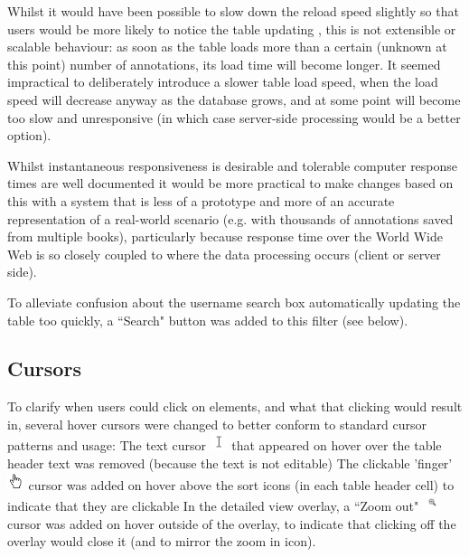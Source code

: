 Whilst it would have been possible to slow down the reload speed slightly so that users would be more likely to notice the table updating \citep[p. 282]{Shneiderman1984}, this is not extensible or scalable behaviour: as soon as the table loads more than a certain (unknown at this point) number of annotations, its load time will become longer. It seemed impractical to deliberately introduce a slower table load speed, when the load speed will decrease anyway as the database grows, and at some point will become too slow and unresponsive (in which case server-side processing would be a better option). 

Whilst instantaneous responsiveness is desirable \citep[p. 272]{DixFinlay} and tolerable computer response times are well documented \citep[p. 154]{Nah} it would be more practical to make changes based on this with a system that is less of a prototype and more of an accurate representation of a real-world scenario (e.g. with thousands of annotations saved from multiple books), particularly because response time over the World Wide Web is so closely coupled to where the data processing occurs (client or server side). 

To alleviate confusion about the username search box automatically updating the table too quickly, a ``Search" button was added to this filter (see below). 

\subsection{Cursors}
To clarify when users could click on elements, and what that clicking would result in, several hover cursors were changed to better conform to standard cursor patterns and usage:
The text cursor \includegraphics[width=0.5cm]{Figures/textcursor.png} that appeared on hover over the table header text was removed (because the text is not editable)
The clickable 'finger' \includegraphics[width=0.5cm]{Figures/handcursor.png} cursor was added on hover above the sort icons (in each table header cell) to indicate that they are clickable
In the detailed view overlay, a ``Zoom out"  \includegraphics[width=0.5cm]{Figures/V2/zoomout.png} cursor was added on hover outside of the overlay, to indicate that clicking off the overlay would close it (and to mirror the zoom in icon). 

